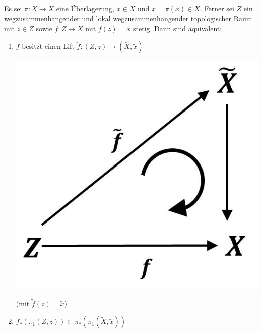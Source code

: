 \documentclass[a4paper,11pt,notitlepage]{report}
\theoremstyle{definition}
\begin{document}
\begin{theorem}
	Es sei $\pi \colon \widetilde{X} \rightarrow X$ eine Überlagerung, $\widetilde{x} \in \widetilde{X}$ und $x = \pi(\widetilde{x}) \in X$. Ferner sei $Z$ ein wegzusammenhängender und lokal wegzusammenhängender topologischer Raum mit $z \in Z$ sowie $f \colon Z \rightarrow X$ mit $f(z)=x$ stetig. Dann sind äquivalent:
	\begin{enumerate}
		\item $f$ besitzt einen Lift $\widetilde{f} \colon (Z,z) \rightarrow (\widetilde{X}, \widetilde{x})$ \begin{center}
	 	\includegraphics[scale=0.5]{images/2011_12_20_Bild5.jpg}
	 \end{center} (mit $\widetilde{f}(z) = \widetilde{x}$)
		\item $f_*(\pi_1(Z,z)) \subset \pi_*(\pi_1(\widetilde{X}, \widetilde{x}))$
	\end{enumerate}
\end{theorem}
\end{document}
